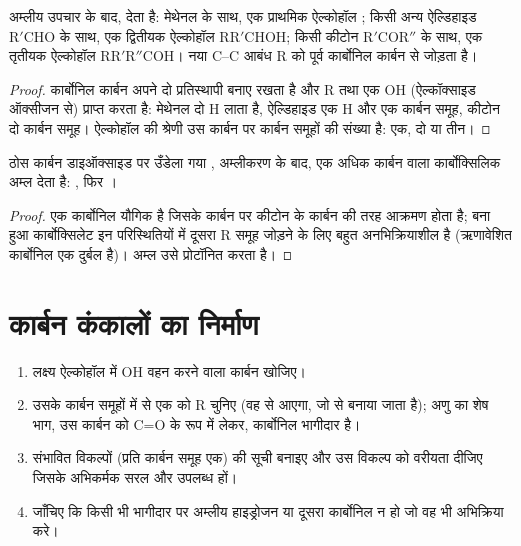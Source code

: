 \begin{proposition}[कार्बोनिल यौगिकों से ऐल्कोहॉल]\label{prop:b1:organomagnesium:carbonyl-addition}
अम्लीय उपचार के बाद,   देता है: मेथेनल के साथ, एक
प्राथमिक ऐल्कोहॉल ; किसी अन्य ऐल्डिहाइड $\mathrm{R'CHO}$ के साथ, एक द्वितीयक
ऐल्कोहॉल $\mathrm{RR'CHOH}$; किसी कीटोन $\mathrm{R'COR''}$ के साथ, एक तृतीयक ऐल्कोहॉल
$\mathrm{RR'R''COH}$। नया C--C आबंध R को पूर्व कार्बोनिल कार्बन से जोड़ता है।
\end{proposition}

\begin{proof}
कार्बोनिल कार्बन अपने दो प्रतिस्थापी बनाए रखता है और R तथा एक OH
(ऐल्कॉक्साइड ऑक्सीजन से) प्राप्त करता है: मेथेनल दो H लाता है, ऐल्डिहाइड एक H और
एक कार्बन समूह, कीटोन दो कार्बन समूह। ऐल्कोहॉल की श्रेणी
उस कार्बन पर कार्बन समूहों की संख्या है: एक, दो या तीन।
\end{proof}

\begin{proposition}[कार्बन डाइऑक्साइड से कार्बोक्सिलिक अम्ल]\label{prop:b1:organomagnesium:co2}
ठोस कार्बन डाइऑक्साइड पर उँडेला गया ,
अम्लीकरण के बाद, एक अधिक कार्बन वाला कार्बोक्सिलिक अम्ल  देता है:
, फिर ।
\end{proposition}

\begin{proof}
 एक कार्बोनिल यौगिक है जिसके कार्बन पर कीटोन के कार्बन की तरह
आक्रमण होता है; बना हुआ कार्बोक्सिलेट इन परिस्थितियों में दूसरा R समूह जोड़ने के लिए
बहुत अनभिक्रियाशील है (ऋणावेशित कार्बोनिल एक दुर्बल
 है)। अम्ल उसे प्रोटॉनित करता है।
\end{proof}

\section{कार्बन कंकालों का निर्माण}

\begin{method}[किसी ऐल्कोहॉल की योजना]\label{met:b1:organomagnesium:plan-alcohol}
\begin{enumerate}
  \item लक्ष्य ऐल्कोहॉल में OH वहन करने वाला कार्बन खोजिए।
  \item उसके कार्बन समूहों में से एक को R चुनिए (वह
         से आएगा, जो  से बनाया जाता है); अणु का
        शेष भाग, उस कार्बन को C=O के रूप में लेकर, कार्बोनिल भागीदार है।
  \item संभावित विकल्पों (प्रति कार्बन समूह एक) की सूची बनाइए और उस विकल्प को
        वरीयता दीजिए जिसके अभिकर्मक सरल और उपलब्ध हों।
  \item जाँचिए कि किसी भी भागीदार पर अम्लीय हाइड्रोजन या दूसरा
        कार्बोनिल न हो जो वह भी अभिक्रिया करे।
\end{enumerate}
\end{method}

